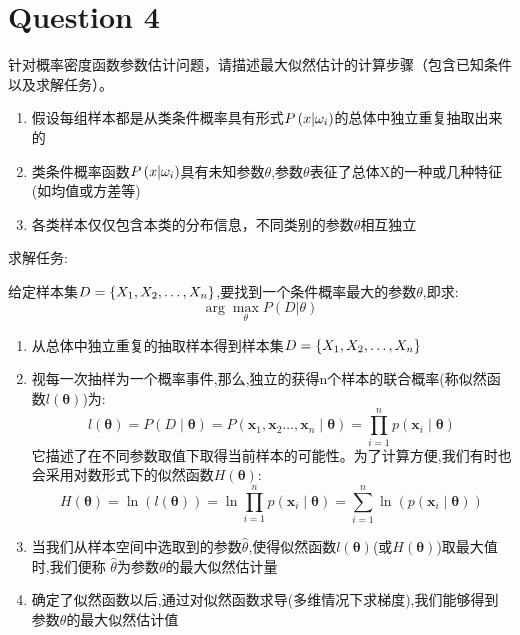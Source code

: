 \documentclass[homework]{IEEEtran}
\begin{document}
\section{Question 4}
\begin{CJK}{UTF8}{gkai}
    针对概率密度函数参数估计问题，请描述最大似然估计的计算步骤（包含已知条件以及求解任务）。 \par
    \begin{enumerate}[已知条件:]
		\item 假设每组样本都是从类条件概率具有形式$P\left(\\x\vert\omega_i\right)$的总体中独立重复抽取出来的
		\item 类条件概率函数$P\left(\\x\vert\omega_i\right)$具有未知参数$\theta$,参数$\theta$表征了总体X的一种或几种特征(如均值或方差等)
		\item 各类样本仅仅包含本类的分布信息，不同类别的参数$\theta$相互独立
    	\end{enumerate}
    求解任务: \par
        给定样本集$D=\left\{\\X_1,\\X_2,\dots,\\X_n\right\}$,要找到一个条件概率最大的参数$\theta$,即求:$$\arg \max_\theta P\left(D\vert\theta\right)$$
    \begin{enumerate}[计算步骤:]
        \item 从总体中独立重复的抽取样本得到样本集$D=\left\{\\X_1,\\X_2,\dots,\\X_n\right\}$
        \item 视每一次抽样为一个概率事件,那么,独立的获得n个样本的联合概率(称似然函数$l(\boldsymbol{\theta})$)为:
        $$
        l(\boldsymbol{\theta})=P(D \mid \boldsymbol{\theta})=P\left(\mathbf{x}_1, \mathbf{x}_2 \ldots, \mathbf{x}_n \mid \boldsymbol{\theta}\right)=\prod_{i=1}^n p\left(\mathbf{x}_i \mid \boldsymbol{\theta}\right)
        $$
        它描述了在不同参数取值下取得当前样本的可能性。为了计算方便,我们有时也会采用对数形式下的似然函数$H(\boldsymbol{\theta})$:
        $$
        H(\boldsymbol{\theta})=\ln (l(\boldsymbol{\theta}))=\ln \prod_{i=1}^n p\left(\mathbf{x}_i \mid \boldsymbol{\theta}\right)=\sum_{i=1}^n \ln \left(p\left(\mathbf{x}_i \mid \boldsymbol{\theta}\right)\right)
        $$
        \item 当我们从样本空间中选取到的参数$\hat\theta$,使得似然函数$l(\boldsymbol{\theta})$(或$H(\boldsymbol{\theta})$)取最大值时,我们便称
        $\hat\theta$为参数$\theta$的最大似然估计量
        \item 确定了似然函数以后,通过对似然函数求导(多维情况下求梯度),我们能够得到参数$\theta$的最大似然估计值
    \end{enumerate}
\end{CJK}
\end{document}
